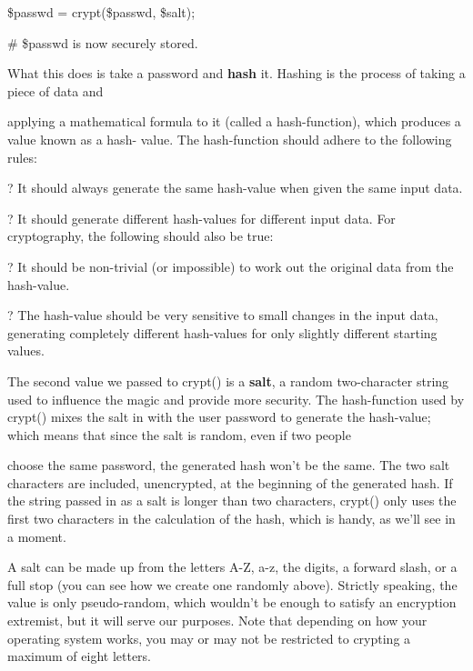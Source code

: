 \documentclass[a4paper,11pt]{book}
\begin{document}
\noindent \$passwd = crypt(\$passwd, \$salt);

\noindent 

\noindent \# \$passwd is now securely stored.

\noindent 

\noindent What this does is take a password and \textbf{hash }it. Hashing is the process of taking a piece of data and

\noindent applying a mathematical formula to it (called a hash-function), which produces a value known as a hash- value. The hash-function should adhere to the following rules:

\noindent 

\noindent ? It should always generate the same hash-value when given the same input data.

\noindent 

? It should generate different hash-values for different input data. For cryptography, the following should also be true:

\noindent ? It should be non-trivial (or impossible) to work out the original data from the hash-value.

\noindent 

\noindent ? The hash-value should be very sensitive to small changes in the input data, generating completely different hash-values for only slightly different starting values.

\noindent 

\noindent The second value we passed to crypt() is a \textbf{salt}, a random two-character string used to influence the magic and provide more security. The hash-function used by crypt() mixes the salt in with the user password to generate the hash-value; which means that since the salt is random, even if two people

\noindent choose the same password, the generated hash won't be the same. The two salt characters are included, unencrypted, at the beginning of the generated hash. If the string passed in as a salt is longer than two characters, crypt() only uses the first two characters in the calculation of the hash, which is handy, as we'll see in a moment.

\noindent 

\noindent A salt can be made up from the letters A-Z, a-z, the digits, a forward slash, or a full stop (you can see how we create one randomly above). Strictly speaking, the value is only pseudo-random, which wouldn't be enough to satisfy an encryption extremist, but it will serve our purposes. Note that depending on how your operating system works, you may or may not be restricted to crypting a maximum of eight letters.
\end{document}
